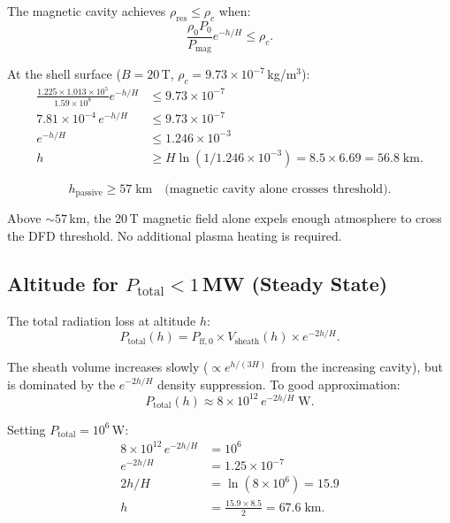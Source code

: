 \documentclass[12pt,a4paper]{article}
\begin{document}
The magnetic cavity achieves $\rho_{\text{res}} \leq \rho_c$ when:
\begin{equation}
  \frac{\rho_0 P_0}{P_{\text{mag}}} e^{-h/H} \leq \rho_c.
\end{equation}

At the shell surface ($B = 20$\,T, $\rho_c = 9.73\times10^{-7}$\,kg/m$^3$):
\begin{align}
  \frac{1.225 \times 1.013\times10^5}{1.59\times10^8} e^{-h/H} &\leq 9.73\times10^{-7} \\
  7.81\times10^{-4} \, e^{-h/H} &\leq 9.73\times10^{-7} \\
  e^{-h/H} &\leq 1.246\times10^{-3} \\
  h &\geq H \ln(1/1.246\times10^{-3}) = 8.5 \times 6.69 = 56.8 \; \text{km}.
\end{align}

\begin{equation}
  \boxed{h_{\text{passive}} \geq 57 \; \text{km} \quad \text{(magnetic cavity alone crosses threshold).}}
\end{equation}

Above $\sim 57$\,km, the 20\,T magnetic field alone expels enough atmosphere to cross the
DFD threshold.  No additional plasma heating is required.

\subsection{Altitude for $P_{\text{total}} < 1$\,MW (Steady State)}

The total radiation loss at altitude $h$:
\begin{equation}
  P_{\text{total}}(h) = P_{\text{ff},0} \times V_{\text{sheath}}(h) \times e^{-2h/H}.
\end{equation}

The sheath volume increases slowly ($\propto e^{h/(3H)}$ from the increasing cavity), but
is dominated by the $e^{-2h/H}$ density suppression.  To good approximation:
\begin{equation}
  P_{\text{total}}(h) \approx 8\times10^{12} \, e^{-2h/H} \; \text{W}.
\end{equation}

Setting $P_{\text{total}} = 10^6$\,W:
\begin{align}
  8\times10^{12} \, e^{-2h/H} &= 10^6 \\
  e^{-2h/H} &= 1.25\times10^{-7} \\
  2h/H &= \ln(8\times10^6) = 15.9 \\
  h &= \frac{15.9 \times 8.5}{2} = 67.6 \; \text{km}.
\end{align}
\end{document}
